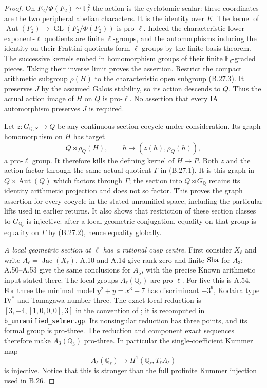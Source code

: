 \begin{proof}
On $F_2/\Phi(F_2)\simeq\mathbb F_\ell^2$ the
action is the cyclotomic scalar: these coordinates
are the two peripheral abelian characters.
It is the identity over $K$.
The kernel of
$\operatorname{Aut}(F_2)\to
 \operatorname{GL}(F_2/\Phi(F_2))$ is pro-$\ell$.
Indeed the characteristic lower exponent-$\ell$
quotients are finite $\ell$-groups, and the
automorphisms inducing the identity on their
Frattini quotients form $\ell$-groups by the
finite basis theorem. The successive kernels
embed in homomorphism groups of their finite
$\mathbb F_\ell$-graded pieces.
Taking their inverse limit proves the assertion.
Restrict the compact arithmetic subgroup
$\rho(H)$ to the characteristic open subgroup
(B.27.3). It preserves $J$ by the assumed
Galois stability, so its action descends to $Q$.
Thus the actual action image of $H$ on $Q$
is pro-$\ell$. No assertion that every IA
automorphism preserves $J$ is required.

Let $z:G_{\mathbb Q,S}\to Q$ be any continuous
section cocycle under consideration.
Its graph homomorphism on $H$ has target
\[
 Q\rtimes\rho_Q(H),
 \qquad h\longmapsto(z(h),\rho_Q(h)),
\]
a pro-$\ell$ group. It therefore kills the
defining kernel of $H\to P$. Both $z$ and
the action factor through the same actual
quotient $\Gamma$ in (B.27.1).
It is this graph in $Q\rtimes\operatorname{Aut}(Q)$
which factors through $\Gamma$; the section into
$Q\rtimes G_{\mathbb Q}$ retains its identity
arithmetic projection and does not so factor.
This proves the graph assertion for every cocycle
in the stated unramified space, including
the particular lifts used in earlier returns.
It also shows that restriction of these section
classes to $G_{\mathbb Q_\ell}$ is injective:
after a local geometric conjugation, equality
on that group is equality on $\Gamma$ by
(B.27.2), hence equality globally.

\emph{A local geometric section at $\ell$ has a rational
cusp centre.}
First consider $X_\ell$ and write
$A_\ell=\operatorname{Jac}(X_\ell)$.
A.10 and A.14 give rank zero and finite $\mathop{\mathrm{Sha}}$
for $A_3$; A.50--A.53 give the same conclusions
for $A_5$, with the precise Known arithmetic
input stated there.
The local groups $A_\ell(\mathbb Q_\ell)$
are pro-$\ell$.
For five this is A.54.
For three the minimal model
$y^2+y=x^3-7$ has discriminant $-3^9$,
Kodaira type $\mathrm{IV}^*$ and Tamagawa number
three. The exact local reduction is
$[3,-4,[1,0,0,0],3]$ in the convention of
\citet[\texttt{elllocalred}]{BPARIElliptic2026};
it is recomputed in \texttt{b\_unramified\_selmer.gp}.
Its nonsingular reduction has three points,
and its formal group is pro-three.
The reduction and component exact sequences
therefore make $A_3(\mathbb Q_3)$ pro-three.
In particular the single-coefficient Kummer map
\[
 A_\ell(\mathbb Q_\ell)\longrightarrow
           H^1(\mathbb Q_\ell,T_\ell A_\ell)
                                                               \tag{B.27.4}
\]
is injective. Notice that this is stronger than
the full profinite Kummer injection used in B.26.


\end{proof}
